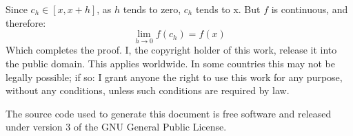 \documentclass{article}
\theoremstyle{plain}
\begin{document}
    Since $c_{h}\in[x,x+h]$, as $h$ tends to zero, $c_{h}$ tends to x.
    But $f$ is continuous, and therefore:
    \begin{equation}
        \lim_{h\rightarrow{0}}f(c_{h})=f(x)
    \end{equation}
    Which completes the proof.
    \newpage
    I, the copyright holder of this work, release it into the public domain.
    This applies worldwide. In some countries this may not be legally possible;
    if so: I grant anyone the right to use this work for any purpose, without
    any conditions, unless such conditions are required by law.
    \par\hfill\par
    The source code used to generate this document is free software and released
    under version 3 of the GNU General Public License.
\end{document}
